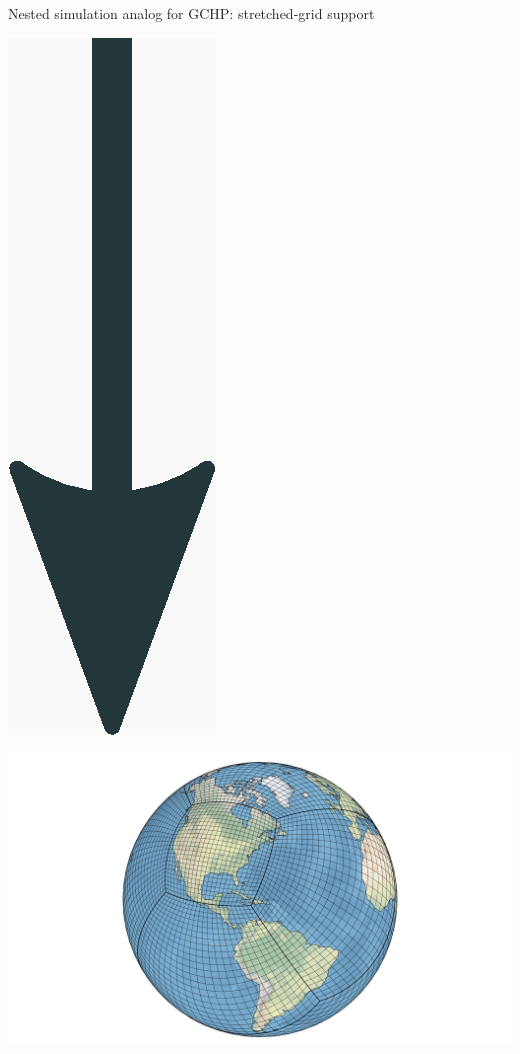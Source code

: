 \documentclass[10pt]{beamer}
\begin{document}
\begin{frame}[fragile]{Nested simulation analog for GCHP: stretched-grid support}
\begin{minipage}[c]{0.48\textwidth}
\begin{center}
        \end{center}
        \begin{center}
            \includegraphics[height=0.05\textheight]{downarrow.eps}
        \end{center}
        \begin{center}
            \includegraphics[height=0.3\textheight]{scs_2.png}
        \end{center}
    \end{minipage}
\end{frame}
\end{document}
